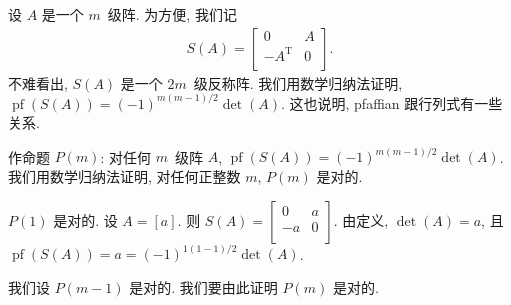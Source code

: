 \documentclass[../libro.tex]{subfiles}
\begin{document}
\begin{example}
    设 \(A\) 是一个 \(m\)~级阵.
    为方便, 我们记
    \begin{align*}
        S(A) =
        \begin{bmatrix}
            0               & A \\
            -A^{\mathrm{T}} & 0 \\
        \end{bmatrix}.
    \end{align*}
    不难看出, \(S(A)\) 是一个 \(2m\)~级反称阵.
    我们用数学归纳法证明,
    \(\operatorname{pf} {(S(A))}
    = (-1)^{m(m-1)/2} \det {(A)}\).
    这也说明, pfaffian 跟行列式有一些关系.

    作命题 \(P(m)\):
    对任何 \(m\)~级阵 \(A\),
    \(\operatorname{pf} {(S(A))}
    = (-1)^{m(m-1)/2} \det {(A)}\).
    我们用数学归纳法证明,
    对任何正整数 \(m\), \(P(m)\) 是对的.

    \(P(1)\) 是对的.
    设 \(A = [a]\).
    则 \(S(A) =
        \begin{bmatrix}
            0  & a \\
            -a & 0 \\
    \end{bmatrix}\).
    由定义, \(\det {(A)} = a\),
    且
    \(\operatorname{pf} {(S(A))}
        = a
    = (-1)^{1(1-1)/2} \det {(A)}\).

    我们设 \(P(m-1)\) 是对的.
    我们要由此证明 \(P(m)\) 是对的.


\end{example}
\end{document}
